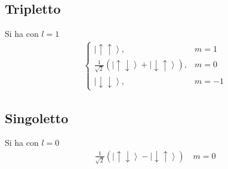 \subsection{Tripletto} %
Si ha con $l=1$
\begin{equation}\begin{split}
\begin{cases}
\left |\uparrow \uparrow \right\rangle, & m=1\\
\frac{1}{\sqrt{2}}\left(\left |\uparrow \downarrow \right\rangle+\left |\downarrow \uparrow \right\rangle\right), & m=0\\
\left |\downarrow \downarrow \right\rangle, & m=-1
\end{cases}
\end{split}\end{equation}

\subsection{Singoletto} %
Si ha con $l=0$
\begin{equation}\begin{split}
\frac{1}{\sqrt{2}}\left(\left |\uparrow \downarrow \right\rangle-\left |\downarrow \uparrow \right\rangle\right) \quad m=0
\end{split}\end{equation}